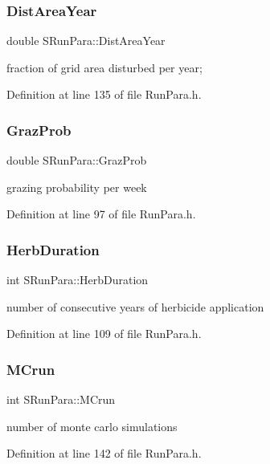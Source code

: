 \subsubsection{\texorpdfstring{DistAreaYear}{DistAreaYear}}
{\footnotesize\ttfamily double S\+Run\+Para\+::\+Dist\+Area\+Year}

fraction of grid area disturbed per year; 

Definition at line 135 of file Run\+Para.\+h.

\mbox{\label{struct_s_run_para_acb13e5adf214fe475adadcdf188f7edf}} 
\subsubsection{\texorpdfstring{GrazProb}{GrazProb}}
{\footnotesize\ttfamily double S\+Run\+Para\+::\+Graz\+Prob}

grazing probability per week 

Definition at line 97 of file Run\+Para.\+h.

\mbox{\label{struct_s_run_para_aa2c8bf31288f1259299ddbcee53e114c}} 
\subsubsection{\texorpdfstring{HerbDuration}{HerbDuration}}
{\footnotesize\ttfamily int S\+Run\+Para\+::\+Herb\+Duration}

number of consecutive years of herbicide application 

Definition at line 109 of file Run\+Para.\+h.

\mbox{\label{struct_s_run_para_a2a27f5c7f845060ffbb177fb4ba08ed8}} 
\subsubsection{\texorpdfstring{MCrun}{MCrun}}
{\footnotesize\ttfamily int S\+Run\+Para\+::\+M\+Crun}

number of monte carlo simulations 

Definition at line 142 of file Run\+Para.\+h.

